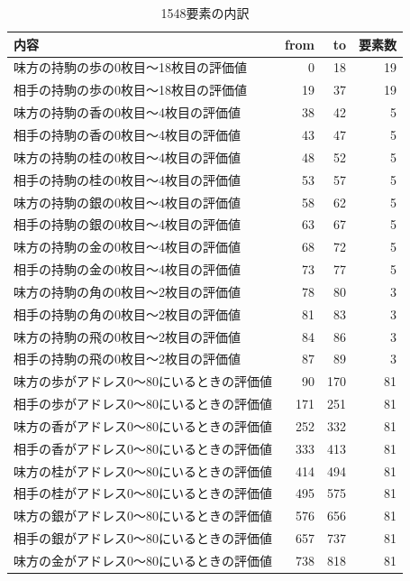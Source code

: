 \documentclass[11pt,a4paper]{ltjsarticle}
\begin{document}
\begin{table}[h]
  \centering
  \caption{1548要素の内訳}
  \small
  \begin{tabular}{lrrr}
    内容 & from & to & 要素数 \\ \hline
    味方の持駒の歩の0枚目～18枚目の評価値 &  0 & 18 & 19 \\
    相手の持駒の歩の0枚目～18枚目の評価値 & 19 & 37 & 19 \\
    味方の持駒の香の0枚目～4枚目の評価値  & 38 & 42 &  5 \\
    相手の持駒の香の0枚目～4枚目の評価値  & 43 & 47 &  5 \\
    味方の持駒の桂の0枚目～4枚目の評価値  & 48 & 52 &  5 \\
    相手の持駒の桂の0枚目～4枚目の評価値  & 53 & 57 &  5 \\
    味方の持駒の銀の0枚目～4枚目の評価値  & 58 & 62 &  5 \\
    相手の持駒の銀の0枚目～4枚目の評価値  & 63 & 67 &  5 \\
    味方の持駒の金の0枚目～4枚目の評価値  & 68 & 72 &  5 \\
    相手の持駒の金の0枚目～4枚目の評価値  & 73 & 77 &  5 \\
    味方の持駒の角の0枚目～2枚目の評価値  & 78 & 80 &  3 \\
    相手の持駒の角の0枚目～2枚目の評価値  & 81 & 83 &  3 \\
    味方の持駒の飛の0枚目～2枚目の評価値  & 84 & 86 &  3 \\
    相手の持駒の飛の0枚目～2枚目の評価値  & 87 & 89 &  3 \\
    味方の歩がアドレス0～80にいるときの評価値 &   90 &  170 & 81 \\
    相手の歩がアドレス0～80にいるときの評価値 &  171 &  251 & 81 \\
    味方の香がアドレス0～80にいるときの評価値 &  252 &  332 & 81 \\
    相手の香がアドレス0～80にいるときの評価値 &  333 &  413 & 81 \\
    味方の桂がアドレス0～80にいるときの評価値 &  414 &  494 & 81 \\
    相手の桂がアドレス0～80にいるときの評価値 &  495 &  575 & 81 \\
    味方の銀がアドレス0～80にいるときの評価値 &  576 &  656 & 81 \\
    相手の銀がアドレス0～80にいるときの評価値 &  657 &  737 & 81 \\
    味方の金がアドレス0～80にいるときの評価値 &  738 &  818 & 81 \\

\end{tabular}
\end{table}
\end{document}
